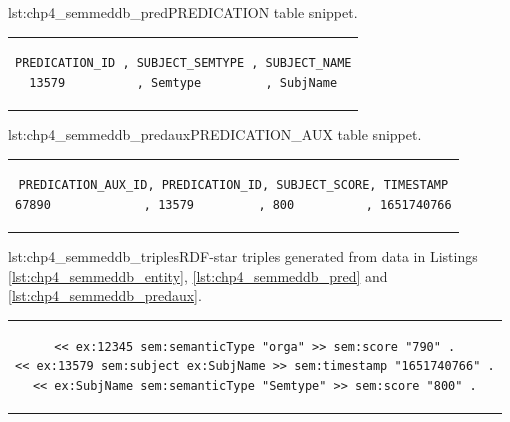 \begin{minipage}{\linewidth}
\begin{captionedlisting}{lst:chp4_semmeddb_pred}{PREDICATION table snippet.}
\centering
\begin{tabular}{c}
{
\begin{lstlisting}[basicstyle=\ttfamily\small,label={list:example1},columns=flexible]
PREDICATION_ID , SUBJECT_SEMTYPE , SUBJECT_NAME
13579          , Semtype         , SubjName
\end{lstlisting}
}
\end{tabular}
\end{captionedlisting}
\end{minipage}

\begin{minipage}{\linewidth}
\begin{captionedlisting}{lst:chp4_semmeddb_predaux}{PREDICATION\_AUX table snippet.}
\centering
\begin{tabular}{c}
{
\begin{lstlisting}[basicstyle=\ttfamily\small,label={list:example1},columns=flexible]
PREDICATION_AUX_ID, PREDICATION_ID, SUBJECT_SCORE, TIMESTAMP
67890             , 13579         , 800          , 1651740766
\end{lstlisting}
}
\end{tabular}
\end{captionedlisting}
\end{minipage}

\begin{minipage}{\linewidth}
\begin{captionedlisting}{lst:chp4_semmeddb_triples}{RDF-star triples generated from data in Listings \ref{lst:chp4_semmeddb_entity}, \ref{lst:chp4_semmeddb_pred} and \ref{lst:chp4_semmeddb_predaux}.}
\centering
\begin{tabular}{c}
{
\begin{lstlisting}[basicstyle=\ttfamily\small,label={list:example1},columns=flexible]
<< ex:12345 sem:semanticType "orga" >> sem:score "790" .
<< ex:13579 sem:subject ex:SubjName >> sem:timestamp "1651740766" .
<< ex:SubjName sem:semanticType "Semtype" >> sem:score "800" .
\end{lstlisting}
}
\end{tabular}
\end{captionedlisting}
\end{minipage}

